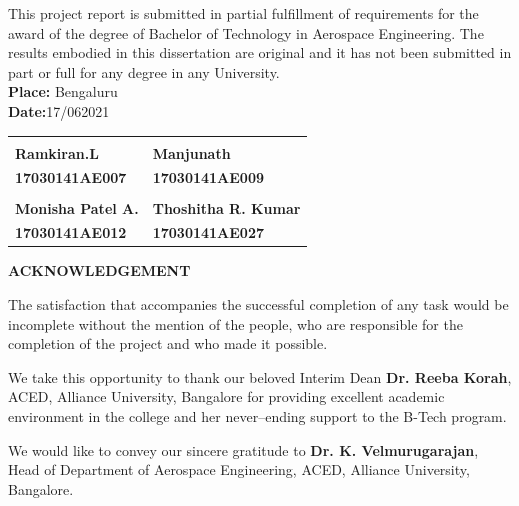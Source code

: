 \documentclass[12pt]{article}
\begin{document}
This project report is submitted in partial fulfillment of requirements for the award of the degree of Bachelor of Technology in Aerospace Engineering. The results embodied in this dissertation are original and it has not been submitted in part or full for any degree in any University. \vspace{4em}\\
\textbf{Place:} Bengaluru\\
\textbf{Date:}17/062021 \vspace{5em}\\

\begin{center}
\begin{tabular}{K{7.5cm} K{7.5cm}}
\underline{\hspace{2.5cm}} & \underline{\hspace{2.5cm}} \\ 
\textbf{Ramkiran.L} & \textbf{Manjunath} \\ 
\textbf{17030141AE007} & \textbf{17030141AE009} \vspace{3em}\\ 
\underline{\hspace{3cm}} & \underline{\hspace{4cm}} \\ 
\textbf{Monisha Patel A.} & \textbf{Thoshitha R. Kumar} \\ 
\textbf{17030141AE012} & \textbf{17030141AE027}
\end{tabular} 
\end{center}
\thispagestyle{empty}
\newpage
\begin{center}
\Large \textbf{ACKNOWLEDGEMENT}
\end{center}
\normalsize
\hspace{4em}The satisfaction that accompanies the successful completion of any task would be incomplete without the mention of the people, who are responsible for the completion of the project and who made it possible.\par

We take this opportunity to thank our beloved Interim Dean \textbf{Dr. Reeba Korah}, ACED, Alliance University, Bangalore for providing excellent academic environment in the college and her never--ending support to the B-Tech program.\par

We would like to convey our sincere gratitude to \textbf{Dr. K. Velmurugarajan}, Head of Department of Aerospace Engineering, ACED, Alliance University, Bangalore. \par
\end{document}
